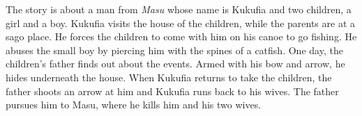 The story is about a man from \textit{Masu} whose name is Kukufia and two children, a girl and a boy. Kukufia visits the house of the children, while the parents are at a sago place. He forces the children to come with him on his canoe to go fishing. He abuses the small boy by piercing him with the spines of a catfish.
One day, the children's father finds out about the events. Armed with his bow and arrow, he hides underneath the house. When Kukufia returns to take the children, the father shoots an arrow at him and Kukufia runs back to his wives. The father pursues him to Masu, where he kills him and his two wives.